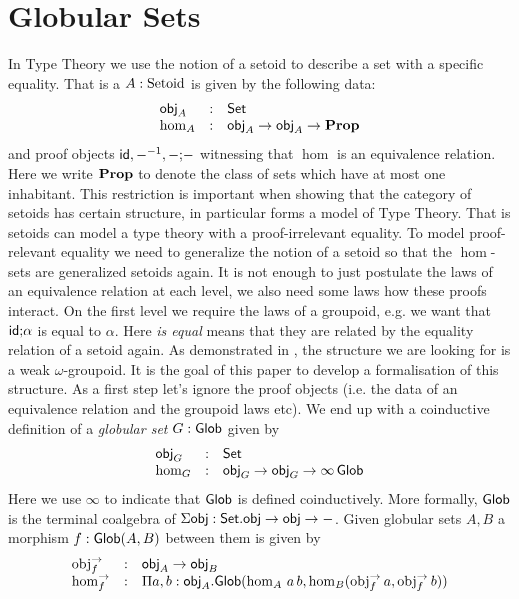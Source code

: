 \section{Globular Sets}
\label{sec:glob}


In Type Theory we use the notion of a setoid to describe a set with a
specific equality. That is a $A : \mathrm{Setoid}$ is given by the
following data:
\[\begin{array}{lcl}
  \mathsf{obj}_A & : & \mathsf{Set} \\
  \hom_A & : & \mathsf{obj}_A \rightarrow \mathsf{obj}_A \rightarrow \mathbf{Prop}
\end{array}\]
and proof objects $\mathsf{id}, {-}^{-1}, - \text{;} -$ witnessing that $\hom$ is an
equivalence relation. Here we write $\mathbf{Prop}$ to denote the class of sets
which have at most one inhabitant. This restriction is important when
showing that the category of setoids has certain structure, in
particular forms a model of Type Theory. That is setoids can model a
type theory with a proof-irrelevant equality. To model proof-relevant
equality we need to generalize the notion of a setoid so that the
$\hom$-sets are generalized setoids again. It is not enough to just
postulate the laws of an equivalence relation at each level, we also
need some laws how these proofs interact. On the first level we
require the laws of a groupoid, e.g. we want that $\mathsf{id} \text{;} \alpha$ is
equal to $\alpha$. Here \emph{is equal} means that they are related by the
equality relation of a setoid again. As demonstrated in
\cite{berg08:types-are, lumsdaine10:weak-o-categories}, the structure we are
looking for is a weak $\omega$-groupoid. It is the goal of this paper
to develop a formalisation of this structure. As a first step let's
ignore the proof objects (i.e. the data of an equivalence relation and
the groupoid laws etc).
We end up with a coinductive definition of a \emph{globular set} $G :
\mathsf{Glob}$ given by
\[\begin{array}{lcl}
  \mathsf{obj}_G & : & \mathsf{Set} \\
  \hom_G & : & \mathsf{obj}_G \rightarrow \mathsf{obj}_G \rightarrow \infty\,\mathsf{Glob}
\end{array}\]
Here we use $\infty$ to indicate that $\mathsf{Glob}$ is defined
coinductively. More formally, $\mathsf{Glob}$ is the terminal coalgebra of
$\Sigma \mathsf{obj} : \mathsf{Set}. \mathsf{obj} \rightarrow \mathsf{obj} \rightarrow -$. Given globular sets
$A,B$ a morphism $f : \mathsf{Glob}(A , B)$ between them is given by 
\[\begin{array}{lcl}
  \mathrm{obj}^{\rightarrow}_f & : & \mathsf{obj}_A \rightarrow \mathsf{obj}_B \\
  \mathrm{hom}^{\rightarrow}_f & : & \Pi a,b:\mathsf{obj}_A.\mathsf{Glob}(\hom_A\,a\,b,\hom_B(\mathrm{obj}^{\rightarrow}_f\,a,\mathrm{obj}^{\rightarrow}_f\,b))
\end{array}\]
